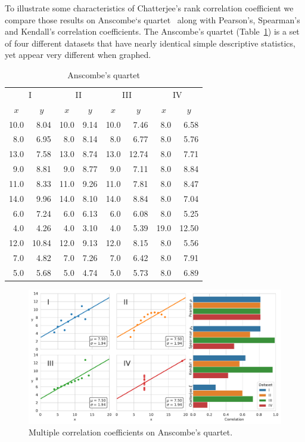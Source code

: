 To illustrate some characteristics of Chatterjee's rank correlation coefficient we compare those results on Anscombe`s quartet~\citep{anscombe1973} along with Pearson's, Spearman's and Kendall's correlation coefficients. The Anscombe's quartet (Table~\ref{tab:anscombe}) is a set of four different datasets that have nearly identical simple descriptive statistics, yet appear very different when graphed.

\begin{table}[ht]
\centering
\caption{Anscombe's quartet}
\label{tab:anscombe}
\begin{tabular}{rr|rr|rr|rr}
\toprule
\multicolumn{2}{c|}{I} & \multicolumn{2}{c|}{II} & \multicolumn{2}{c|}{III} & \multicolumn{2}{c}{IV} \\

\multicolumn{1}{c}{$x$} & \multicolumn{1}{c|}{$y$} & \multicolumn{1}{c}{$x$} & \multicolumn{1}{c|}{$y$} & \multicolumn{1}{c}{$x$} & \multicolumn{1}{c|}{$y$} & \multicolumn{1}{c}{$x$} & \multicolumn{1}{c}{$y$} \\
\midrule
10.0 & 8.04 & 10.0 & 9.14 & 10.0 & 7.46 & 8.0 & 6.58 \\
8.0 & 6.95 & 8.0 & 8.14 & 8.0 & 6.77 & 8.0 & 5.76 \\
13.0 & 7.58 & 13.0 & 8.74 & 13.0 & 12.74 & 8.0 & 7.71 \\
9.0 & 8.81 & 9.0 & 8.77 & 9.0 & 7.11 & 8.0 & 8.84 \\
11.0 & 8.33 & 11.0 & 9.26 & 11.0 & 7.81 & 8.0 & 8.47 \\
14.0 & 9.96 & 14.0 & 8.10 & 14.0 & 8.84 & 8.0 & 7.04 \\
6.0 & 7.24 & 6.0 & 6.13 & 6.0 & 6.08 & 8.0 & 5.25 \\
4.0 & 4.26 & 4.0 & 3.10 & 4.0 & 5.39 & 19.0 & 12.50 \\
12.0 & 10.84 & 12.0 & 9.13 & 12.0 & 8.15 & 8.0 & 5.56 \\
7.0 & 4.82 & 7.0 & 7.26 & 7.0 & 6.42 & 8.0 & 7.91 \\
5.0 & 5.68 & 5.0 & 4.74 & 5.0 & 5.73 & 8.0 & 6.89 \\
\bottomrule
\end{tabular}
\end{table}

\begin{figure}[!ht]
\centering
\caption{Multiple correlation coefficients on Anscombe's quartet.}
    \includegraphics[width=1\linewidth]{images/anscombe_quartet.pdf}
\end{figure}



